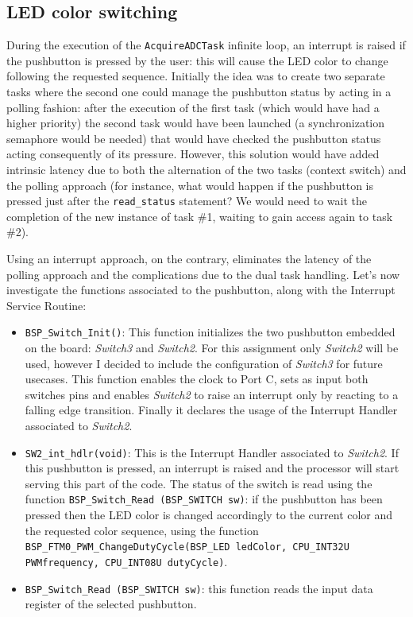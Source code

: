 \documentclass[a4paper]{article}
\begin{document}
        \subsection{LED color switching}
        During the execution of the \texttt{AcquireADCTask} infinite loop, an interrupt is raised if the pushbutton is pressed by the user: this will cause the LED color to change following the requested sequence.
        Initially the idea was to create two separate tasks where the second one could manage the pushbutton status by acting in a polling fashion: after the execution of the first task (which would have had a higher priority) the second task would have been launched (a synchronization semaphore would be needed) that would have checked the pushbutton status acting consequently of its pressure. However, this solution would have added intrinsic latency due to both the alternation of the two tasks (context switch) and the polling approach (for instance, what would happen if the pushbutton is pressed just after the \texttt{read\_status} statement? We would need to wait the completion of the new instance of task \#1, waiting to gain access again to task \#2).

        Using an interrupt approach, on the contrary, eliminates the latency of the polling approach and the complications due to the dual task handling.
        Let's now investigate the functions associated to the pushbutton, along with the Interrupt Service Routine:

        \begin{itemize}
            \item \texttt{BSP\_Switch\_Init()}: This function initializes the two pushbutton embedded on the board: \emph{Switch3} and \emph{Switch2}. For this assignment only \emph{Switch2} will be used, however I decided to include the configuration of \emph{Switch3} for future usecases. This function enables the clock to Port C, sets as input both switches pins and enables \emph{Switch2} to raise an interrupt only by reacting to a falling edge transition. Finally it declares the usage of the Interrupt Handler associated to \emph{Switch2}.
            \item \texttt{SW2\_int\_hdlr(void)}: This is the Interrupt Handler associated to \emph{Switch2}. If this pushbutton is pressed, an interrupt is raised and the processor will start serving this part of the code. The status of the switch is read using the function \texttt{BSP\_Switch\_Read (BSP\_SWITCH sw)}: if the pushbutton has been pressed then the LED color is changed accordingly to the current color and the requested color sequence, using the function \texttt{BSP\_FTM0\_PWM\_ChangeDutyCycle(BSP\_LED ledColor, CPU\_INT32U PWMfrequency, CPU\_INT08U dutyCycle)}.
            \item \texttt{BSP\_Switch\_Read (BSP\_SWITCH sw)}: this function reads the input data register of the selected pushbutton.
        \end{itemize}
\end{document}
